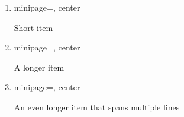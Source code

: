 \documentclass{beamer}
\newcommand{\adjustedbox}[1]{%
  \begin{adjustbox}{minipage=\linewidth, center}
    \begin{varwidth}{\linewidth}
      \begin{tcolorbox}[mybox]
        #1
      \end{tcolorbox}%
    \end{varwidth}%
  \end{adjustbox}%
}
\begin{document}
\begin{frame}
  \begin{enumerate}[label=\arabic*.]
    \item \adjustedbox{Short item}
    \item \adjustedbox{A longer item}
    \item \adjustedbox{An even longer item that spans multiple lines}
  \end{enumerate}
\end{frame}
\end{document}
